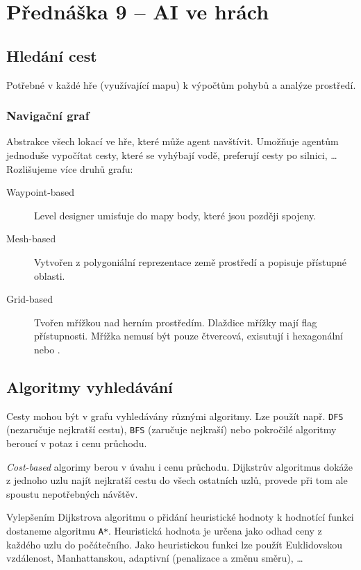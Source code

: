 \section*{Přednáška 9 -- AI ve hrách}

\subsection*{Hledání cest}

Potřebné v každé hře (využívající mapu) k výpočtům pohybů a analýze prostředí.

\subsubsection*{Navigační graf}

Abstrakce všech lokací ve hře, které může agent navštívit.
Umožňuje agentům jednoduše vypočítat cesty, které se vyhýbají vodě, preferují cesty po silnici, \dots
Rozlišujeme více druhů grafu:

\begin{description}
    \item[Waypoint-based] Level designer umisťuje do mapy body, které jsou později spojeny.
    \item[Mesh-based] Vytvořen z polygoniální reprezentace země prostředí a popisuje přístupné oblasti.
    \item[Grid-based] Tvořen mřížkou nad herním prostředím. Dlaždice mřížky mají flag přístupnosti. Mřížka nemusí být pouze čtvercová, exisutují i hexagonální nebo . 
\end{description}

\subsection*{Algoritmy vyhledávání}

Cesty mohou být v grafu vyhledávány různými algoritmy.
Lze použít např. \texttt{DFS} (nezaručuje nejkratší cestu), \texttt{BFS} (zaručuje nejkraší) nebo pokročilé algoritmy beroucí v potaz i cenu průchodu.

\textit{Cost-based} algorimy berou v úvahu i cenu průchodu.
Dijkstrův algoritmus dokáže z jednoho uzlu najít nejkratší cestu do všech ostatních uzlů, provede při tom ale spoustu nepotřebných návštěv.

Vylepšením Dijkstrova algoritmu o přidání heuristické hodnoty k hodnotící funkci dostaneme algoritmu \texttt{A*}.
Heuristická hodnota je určena jako odhad ceny z každého uzlu do počátečního.
Jako heuristickou funkci lze použít Euklidovskou vzdálenost, Manhattanskou, adaptivní (penalizace a změnu směru), \dots

